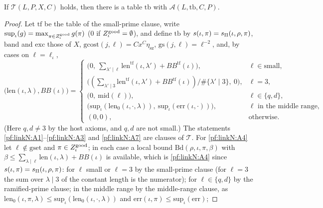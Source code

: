 \begin{lemma}\label{pf:linkN:admitted}
If $\mathcal T(L,P,X,C)$ holds, then there is a table $\mathrm{tb}$ with $\mathcal A(L,\mathrm{tb},C,P)$.
\end{lemma}

\begin{proof}
Let $\mathrm{tf}$ be the table of the small-prime clause, write $\mathrm{sup}_\iota(g)=\max_{\pi\in Z^{\mathrm{good}}_\iota}g(\pi)$ ($0$ if
$Z^{\mathrm{good}}_\iota=\emptyset$), and define $\mathrm{tb}$ by $s(\iota,\pi)=s_\Pi(\iota,\rho,\pi)$, $\mathrm{band}$ and $\mathrm{exc}$
those of $X$, $\mathrm{gcost}(j,\ell)=Cx^C\eta_{\mathrm{sz}}$, $\mathrm{gs}(j,\ell)=\ell^{-2}$, and, by cases on $\ell=\ell_\iota$,
\[
\bigl(\mathrm{len}(\iota,\lambda),BB(\iota)\bigr)=\begin{cases}
\bigl(0,\ \sum_{\lambda'\mid\ell}\mathrm{len}^{\mathrm{tf}}(\iota,\lambda')+BB^{\mathrm{tf}}(\iota)\bigr),&\ell\in\mathrm{small},\\
\bigl((\sum_{\lambda'\mid3}\mathrm{len}^{\mathrm{tf}}(\iota,\lambda')+BB^{\mathrm{tf}}(\iota))/\#\{\lambda'\mid3\},\ 0\bigr),&\ell=3,\\
\bigl(0,\ \mathrm{mid}(\ell)\bigr),&\ell\in\{q,d\},\\
\bigl(\mathrm{sup}_\iota(\mathrm{len}_0(\iota,\cdot,\lambda)),\ \mathrm{sup}_\iota(\mathrm{err}(\iota,\cdot))\bigr),&\ell\text{ in the middle range},\\
(0,0),&\text{otherwise}.
\end{cases}
\]
(Here $q,d\ne3$ by the host axioms, and $q,d$ are not small.) The statements \ref{pf:linkN:A1}--\ref{pf:linkN:A3} and
\ref{pf:linkN:A7} are clauses of $\mathcal T$. For \ref{pf:linkN:A4} let $\ell\notin\mathrm{gset}$ and $\pi\in Z^{\mathrm{good}}_\iota$; in each
case a local bound $\mathrm{Bd}(\rho,\iota,\pi,\beta)$ with $\beta\le\sum_{\lambda\mid\ell}\mathrm{len}(\iota,\lambda)+BB(\iota)$ is
available, which is \ref{pf:linkN:A4} since $s(\iota,\pi)=s_\Pi(\iota,\rho,\pi)$: for $\ell$ small or $\ell=3$ by the small-prime
clause (for $\ell=3$ the sum over $\lambda\mid3$ of the constant length is the numerator); for $\ell\in\{q,d\}$ by the
ramified-prime clause; in the middle range by the middle-range clause, as
$\mathrm{len}_0(\iota,\pi,\lambda)\le\mathrm{sup}_\iota(\mathrm{len}_0(\iota,\cdot,\lambda))$ and $\mathrm{err}(\iota,\pi)\le\mathrm{sup}_\iota(\mathrm{err})$;

\end{proof}
